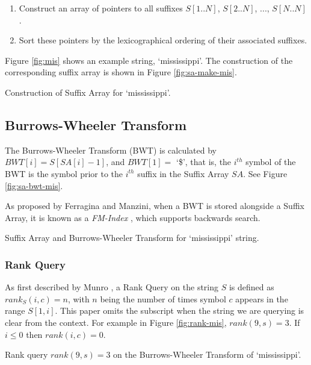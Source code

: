 \begin{enumerate}
	\item
		Construct an array of pointers to all suffixes $S[1..N]$, 
		$S[2..N]$, ..., $S[N..N]$.
	\item
		Sort these pointers by the lexicographical ordering of their associated
		suffixes.
\end{enumerate}

Figure \ref{fig:mis} shows an example string, `mississippi'. The construction of 
the corresponding suffix array is shown in Figure \ref{fig:sa-make-mis}.

			{Construction of Suffix Array for `mississippi'.}



\subsection{Burrows-Wheeler Transform}
The Burrows-Wheeler Transform (BWT) is calculated by $BWT[i] = S[SA[i]-1]$, and $BWT[1] = $ `\$', that is, the $i^{th}$ symbol of the BWT is the symbol prior to the $i^{th}$ suffix in the Suffix Array $SA$. See Figure \ref{fig:sa-bwt-mis}.

As proposed by Ferragina and Manzini, when a BWT is stored alongside a Suffix Array, it is known as a \emph{FM-Index} \cite{ferragina2000}, which supports backwards search.

			{Suffix Array and Burrows-Wheeler Transform for
			`mississippi' string.}

\subsubsection{Rank Query}
As first described by Munro \cite{munro1996}, a Rank Query on the string $S$ is 
defined as $rank_S(i, c) = n $, with $n$ being the number of times symbol $c$ 
appears in the range $S[1, i]$. This paper omits 
the subscript when the string we are querying is clear from the context. For 
example in Figure \ref{fig:rank-mis}, $rank(9, s) = 3$. If $i \le 0$ then 
$rank(i, c) = 0$.

			{Rank query $rank(9, s) = 3$ on the Burrows-Wheeler Transform
			of `mississippi'.}

